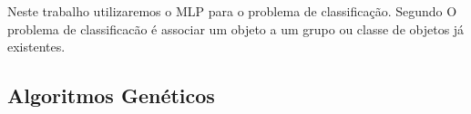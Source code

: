 \documentclass[12pt]{article}
\begin{document}
\par Neste trabalho utilizaremos o MLP para o problema de classificação. Segundo \cite{kasabov} O problema de classificacão é associar um objeto a um grupo ou classe de objetos já existentes. 

















\subsection{Algoritmos Genéticos}
\end{document}
